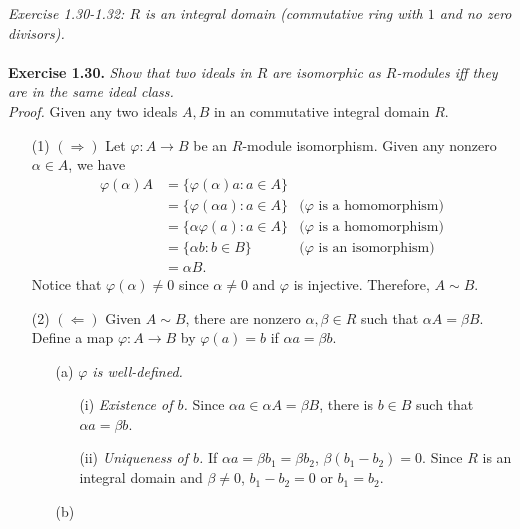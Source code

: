 \documentclass{article}
\begin{document}



\emph{Exercise 1.30-1.32: $R$ is an integral domain
(commutative ring with $1$ and no zero divisors).} \\\\



\textbf{Exercise 1.30.}
\emph{Show that two ideals in $R$ are isomorphic as $R$-modules
iff they are in the same ideal class.} \\

\emph{Proof.}
Given any two ideals $A, B$ in an commutative integral domain $R$.
\begin{enumerate}
\item[(1)]
$(\Longrightarrow)$
Let $\varphi: A \to B$ be an $R$-module isomorphism.
Given any nonzero $\alpha \in A$, we have
\begin{align*}
\varphi(\alpha)A
&= \{ \varphi(\alpha)a : a \in A \} \\
&= \{ \varphi(\alpha a) : a \in A \}
  &\text{($\varphi$ is a homomorphism)} \\
&= \{ \alpha\varphi(a) : a \in A \}
  &\text{($\varphi$ is a homomorphism)} \\
&= \{ \alpha b : b \in B \}
  &\text{($\varphi$ is an isomorphism)} \\
&= \alpha B.
\end{align*}
Notice that $\varphi(\alpha) \neq 0$ since $\alpha \neq 0$ and $\varphi$ is injective.
Therefore, $A \sim B$.
\item[(2)]
$(\Longleftarrow)$
Given $A \sim B$, there are nonzero $\alpha, \beta \in R$ such that $\alpha A = \beta B$.
Define a map $\varphi: A \to B$ by $\varphi(a) = b$ if $\alpha a = \beta b$.
  \begin{enumerate}
  \item[(a)]
  \emph{$\varphi$ is well-defined.}
    \begin{enumerate}
    \item[(i)]
    \emph{Existence of $b$.}
    Since $\alpha a \in \alpha A = \beta B$, there is $b \in B$ such that $\alpha a = \beta b$.
    \item[(ii)]
    \emph{Uniqueness of $b$.}
    If $\alpha a = \beta b_1 = \beta b_2$, $\beta(b_1-b_2) = 0$.
    Since $R$ is an integral domain and $\beta \neq 0$, $b_1-b_2 = 0$ or $b_1 = b_2$.
    \end{enumerate}
  \item[(b)]

\end{enumerate}
\end{enumerate}
\end{document}
